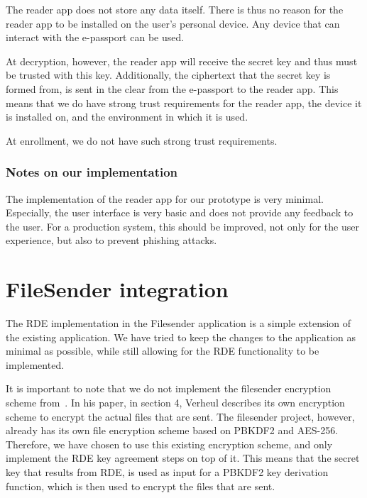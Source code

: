 The reader app does not store any data itself.
There is thus no reason for the reader app to be installed on the user's personal device.
Any device that can interact with the e-passport can be used.

At decryption, however, the reader app will receive the secret key and thus must be trusted with this key.
Additionally, the ciphertext that the secret key is formed from, is sent in the clear from the e-passport to the reader app.
This means that we do have strong trust requirements for the reader app, the device it is installed on, and the environment in which it is used.

At enrollment, we do not have such strong trust requirements.

\subsubsection{Notes on our implementation}
The implementation of the reader app for our prototype is very minimal.
Especially, the user interface is very basic and does not provide any feedback to the user.
For a production system, this should be improved, not only for the user experience, but also to prevent phishing attacks.

\section{FileSender integration}\label{sec:filesender-integration}
The RDE implementation in the Filesender application is a simple extension of the existing application.
We have tried to keep the changes to the application as minimal as possible, while still allowing for the RDE functionality to be implemented.

It is important to note that we do not implement the filesender encryption scheme from~\cite{verheul2020secure}.
In his paper, in section 4, Verheul describes its own encryption scheme to encrypt the actual files that are sent.
The filesender project, however, already has its own file encryption scheme based on PBKDF2 and AES-256.
Therefore, we have chosen to use this existing encryption scheme, and only implement the RDE key agreement steps on top of it.
This means that the secret key that results from RDE, is used as input for a PBKDF2 key derivation function, which is then used to encrypt the files that are sent.


